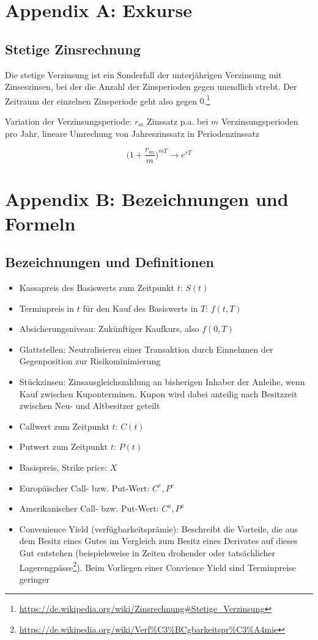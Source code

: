 \section{Appendix A: Exkurse}

\subsection{Stetige Zinsrechnung}

Die stetige Verzinsung ist ein Sonderfall der unterjährigen Verzinsung mit Zinseszinsen, bei der die Anzahl der Zinsperioden gegen unendlich strebt. Der Zeitraum der einzelnen Zinsperiode geht also gegen \(0\).\footnote{\url{https://de.wikipedia.org/wiki/Zinsrechnung\#Stetige_Verzinsung}}

Variation der Verzinsungsperiode: \(r_m\) Zinssatz p.a. bei \(m\) Verzinsungsperioden pro Jahr, lineare Umrechung von Jahreszinssatz in Periodenzinssatz

\[\Big(1+\frac{r_m}{m}\Big)^{mT} \longrightarrow e^{rT}\]


\section{Appendix B: Bezeichnungen und Formeln}

\subsection{Bezeichnungen und Definitionen}
\begin{itemize}
	\item Kassapreis des Basiswerts zum Zeitpunkt \(t\): \(S(t)\)
	\item Terminpreis in \(t\) für den Kauf des Basiswerts in \(T\): \(f(t,T)\)
	\item Absicherungsniveau: Zukünftiger Kaufkurs, also \(f(0,T)\)
	\item Glattstellen: Neutralisieren einer Transaktion durch Einnehmen der Gegenposition zur Risikominimierung
	\item Stückzinsen: Zinsausgleichszahlung an bisherigen Inhaber der Anleihe, wenn Kauf zwischen Kuponterminen. Kupon wird dabei anteilig nach Besitzzeit zwischen Neu- und Altbesitzer geteilt
	\item Callwert zum Zeitpunkt \(t\): \(C(t)\)
	\item Putwert zum Zeitpunkt \(t\): \(P(t)\)
	\item Basispreis, Strike price: \(X\)
	\item Europäischer Call- bzw. Put-Wert: \(C^e, P^e\)
	\item Amerikanischer Call- bzw. Put-Wert: \(C^a, P^a\)
	\item Convenience Yield (verfügbarkeitsprämie): Beschreibt die Vorteile, die aus dem Besitz eines Gutes im Vergleich zum Besitz eines Derivates auf dieses Gut entstehen (beispielsweise in Zeiten drohender oder tatsächlicher Lagerengpässe\footnote{\url{https://de.wikipedia.org/wiki/Verf\%C3\%BCgbarkeitspr\%C3\%A4mie}}). Beim Vorliegen einer Convience Yield sind Terminpreise geringer
\end{itemize}


